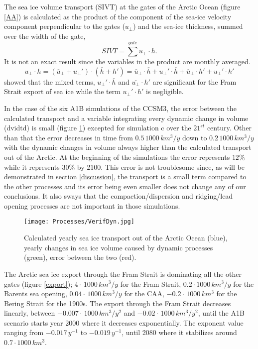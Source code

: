 The sea ice volume transport (SIVT) at the gates of the Arctic Ocean (figure \ref{AA}) is calculated as the product of the component of the sea-ice velocity component perpendicular to the gates ($u_\perp$) and the sea-ice thickness, summed over the width of the gate,
\begin{equation}
SIVT = \sum^{gate} u_\perp \cdot h.
\end{equation}
It is not an exact result since the variables in the product are monthly averaged.
\begin{equation}
u_\perp \cdot h = (\overline{u}_\perp+ u_\perp') \cdot (\overline{h}+h') = \overline{u}_\perp \cdot \overline{h} + u_\perp'\cdot \overline{h} + \overline{u}_\perp \cdot h' + u_\perp' \cdot h'
\end{equation}
\cite{Arfeuille} showed that the mixed terms, $u_\perp'\cdot \overline{h}$ and $\overline{u_\perp} \cdot h'$ are significant for the Fram Strait export of sea ice while the term $u_\perp' \cdot h'$ is negligible. 

In the case of the six A1B simulations of the CCSM3, the error between the calculated transport and a variable integrating every dynamic change in volume (dvidtd) is small  (figure \ref{VerifDyn}) excepted for simulation c over the $21^{st}$ century. Other than that the error decreases in time from $0.5 \, 1000 \, km^3/y$ down to $0.2 \, 1000 \, km^3/y$ with the dynamic changes in volume always higher than the calculated transport out of the Arctic. At the beginning of the simulations the error represents $12\%$ while it represents $30\%$ by 2100. This error is not troublesome since, as will be demonstrated in section \ref{discussion}, the transport is a small term compared to the other processes and its error being even smaller does not change any of our conclusions. It also sways that the compaction/dispersion and ridging/lead opening processes are not important in those simulations.
\begin{figure}
\center
\noindent\texttt{[image: Processes/VerifDyn.jpg]}
\caption{Calculated yearly sea ice transport out of the Arctic Ocean (blue), yearly changes in sea ice volume caused by dynamic processes (green), error between the two (red).}
\label{VerifDyn}
\end{figure}

The Arctic sea ice export through the Fram Strait is dominating all the other gates (figure \ref{export}); $4\cdot \, 1000 \,km^3/y$ for the Fram Strait, $0.2\cdot 1000\, km^3/y$ for the Barents sea opening, $0.04\cdot  \, 1000 \,km^3/y$ for the CAA, $-0.2\cdot  \, 1000 \,km^3$ for the Bering Strait for the 1900s. The export through the Fram Strait decreases linearly, between $-0.007 \cdot  \, 1000 \,km^3/y^2$ and $-0.02 \cdot \, 1000 \,km^3/y^2$, until the A1B scenario starts year 2000 where it decreases exponentially. The exponent value ranging from $-0.017 \, y^{-1}$ to $-0.019 \, y^{-1}$, until 2080 where it stabilizes around $0.7 \cdot 1000 \, km^3$. 

